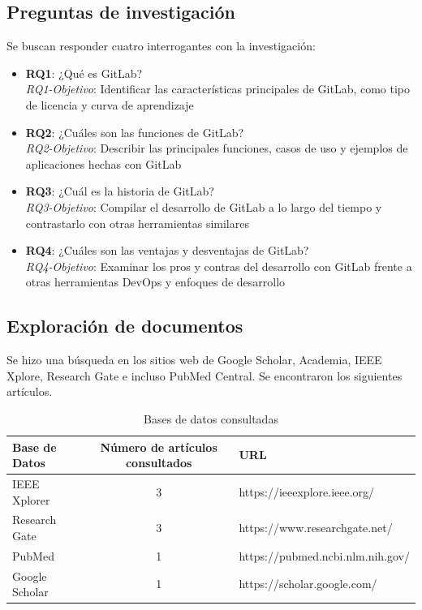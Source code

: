 \documentclass[runningheads]{llncs}
\begin{document}
\subsection{Preguntas de investigación}
Se buscan responder cuatro interrogantes con la investigación:
\begin{itemize}
        \item \textbf{RQ1}: ¿Qué es GitLab?\\
        \textit{RQ1-Objetivo}: Identificar las características principales de GitLab, como tipo de licencia y curva de aprendizaje
        \item \textbf{RQ2}: ¿Cuáles son las funciones de GitLab?\\
        \textit{RQ2-Objetivo}: Describir las principales funciones, casos de uso y ejemplos de aplicaciones hechas con GitLab
        \item \textbf{RQ3}: ¿Cuál es la historia de GitLab?\\
        \textit{RQ3-Objetivo}: Compilar el desarrollo de GitLab a lo largo del tiempo y contrastarlo con otras herramientas similares
        \item \textbf{RQ4}: ¿Cuáles son las ventajas y desventajas de GitLab?\\
        \textit{RQ4-Objetivo}: Examinar los pros y contras del desarrollo con GitLab frente a otras herramientas DevOps y enfoques de desarrollo
\end{itemize}
\subsection{Exploración de documentos}
Se hizo una búsqueda en los sitios web de Google Scholar, Academia, IEEE Xplore, Research Gate e incluso PubMed Central.
Se encontraron los siguientes artículos.
\begin{table}[ht!]
        \centering
        \begin{tabular}{l | c | l}
                Base de Datos & Número de artículos consultados & URL \\
                \hline
                \hline
                IEEE Xplorer & 3 & https://ieeexplore.ieee.org/ \\
                Research Gate & 3 & https://www.researchgate.net/ \\
                PubMed & 1 & https://pubmed.ncbi.nlm.nih.gov/ \\
                Google Scholar & 1 & https://scholar.google.com/ 
        \end{tabular}
        \caption{Bases de datos consultadas}
        \label{table:1}
\end{table}
\end{document}
